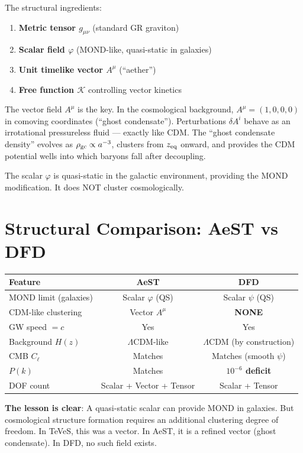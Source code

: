 \documentclass[11pt]{article}
\newcommand{\LCDM}{$\Lambda$CDM}
\begin{document}
The structural ingredients:
\begin{enumerate}[nosep]
\item \textbf{Metric tensor $g_{\mu\nu}$} (standard GR graviton)
\item \textbf{Scalar field $\varphi$} (MOND-like, quasi-static in galaxies)
\item \textbf{Unit timelike vector $A^\mu$} (``aether'')
\item \textbf{Free function $\mathcal{K}$} controlling vector kinetics
\end{enumerate}

The vector field $A^\mu$ is the key. In the cosmological background,
$A^\mu = (1, 0, 0, 0)$ in comoving coordinates (``ghost condensate'').
Perturbations $\delta A^i$ behave as an irrotational pressureless
fluid --- exactly like CDM. The ``ghost condensate density'' evolves as
$\rho_{\rm gc} \propto a^{-3}$, clusters from $z_{\rm eq}$ onward,
and provides the CDM potential wells into which baryons fall after
decoupling.

The scalar $\varphi$ is quasi-static in the galactic environment,
providing the MOND modification. It does NOT cluster cosmologically.

\section{Structural Comparison: AeST vs DFD}

\begin{center}
\begin{tabular}{lcc}
\toprule
Feature & AeST & DFD \\
\midrule
MOND limit (galaxies) & Scalar $\varphi$ (QS) & Scalar $\psi$ (QS) \\
CDM-like clustering & Vector $A^\mu$ & \textbf{NONE} \\
GW speed $= c$ & Yes & Yes \\
Background $H(z)$ & \LCDM-like & \LCDM{} (by construction) \\
CMB $C_\ell$ & Matches & Matches (smooth $\psi$) \\
$P(k)$ & Matches & \textbf{$10^{-6}$ deficit} \\
DOF count & Scalar + Vector + Tensor & Scalar + Tensor \\
\bottomrule
\end{tabular}
\end{center}

\textbf{The lesson is clear}: A quasi-static scalar can provide MOND
in galaxies. But cosmological structure formation requires an additional
clustering degree of freedom. In TeVeS, this was a vector. In AeST,
it is a refined vector (ghost condensate). In DFD, no such field exists.
\end{document}
